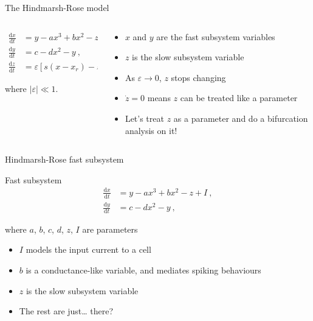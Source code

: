 \documentclass[presentation]{beamer}
\begin{document}
\begin{frame}[label={sec:org802d7d9}]{The Hindmarsh-Rose model}
\begin{columns}
\begin{column}{0.5\columnwidth}
\begin{align}
\frac{\mathrm{d}x}{\mathrm{d}t} &= y - ax^3 +bx^2 -z + I~,\nonumber \\
\frac{\mathrm{d}y}{\mathrm{d}t} &= c - dx^2 - y~,\nonumber \\
\frac{\mathrm{d}z}{\mathrm{d}t} &= \varepsilon \left[s(x-x_r)-z\right]~,\nonumber
\end{align}

where \(|\varepsilon| \ll 1\).
\end{column}

\begin{column}{0.5\columnwidth}
\begin{itemize}
\item \(x\) and \(y\) are the fast subsystem variables
\item \(z\) is the slow subsystem variable
\item As \(\varepsilon \to 0\), \(z\) stops changing
\item \(\dot{z}=0\) means \(z\) can be treated like a parameter
\item Let's treat \(z\) as a parameter and do a bifurcation analysis on it!
\end{itemize}
\end{column}
\end{columns}
\end{frame}

\begin{frame}[label={sec:org0048129}]{Hindmarsh-Rose fast subsystem}
\begin{block}{Fast subsystem}
    \begin{align}
    \frac{\mathrm{d}x}{\mathrm{d}t} &= y - ax^3 +bx^2 -z + I~,\nonumber \\
    \frac{\mathrm{d}y}{\mathrm{d}t} &= c - dx^2 - y~,\nonumber
    \end{align}
\end{block}

where \(a\), \(b\), \(c\), \(d\), \(z\), \(I\) are parameters

\begin{itemize}
\item \(I\) models the input current to a cell
\item \(b\) is a conductance-like variable, and mediates spiking behaviours
\item \(z\) is the slow subsystem variable
\item The rest are just\ldots{} there?
\end{itemize}
\end{frame}
\end{document}
